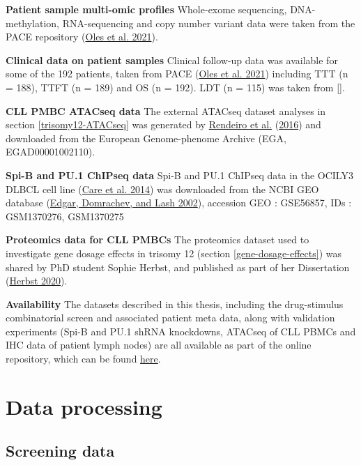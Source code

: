 \documentclass[11pt, a4paper, twosided]{book}
\begin{document}
\textbf{Patient sample multi-omic profiles} Whole-exome sequencing, DNA-methylation, RNA-sequencing and copy number variant data were taken from the PACE repository (\protect\hyperlink{ref-R-BloodCancerMultiOmics2017}{Oles et al. 2021}).

\textbf{Clinical data on patient samples} Clinical follow-up data was available for some of the 192 patients, taken from PACE (\protect\hyperlink{ref-R-BloodCancerMultiOmics2017}{Oles et al. 2021}) including TTT (n = 188), TTFT (n = 189) and OS (n = 192). LDT (n = 115) was taken from {[}{]}.

\textbf{CLL PMBC ATACseq data} The external ATACseq dataset analyses in section \ref{trisomy12-ATACseq} was generated by \protect\hyperlink{ref-Rendeiro2016}{Rendeiro et al.} (\protect\hyperlink{ref-Rendeiro2016}{2016}) and downloaded from the European Genome-phenome Archive (EGA, EGAD00001002110).

\textbf{Spi-B and PU.1 ChIPseq data}
Spi-B and PU.1 ChIPseq data in the OCILY3 DLBCL cell line (\protect\hyperlink{ref-Care2014}{Care et al. 2014}) was downloaded from the NCBI GEO database (\protect\hyperlink{ref-Edgar2002}{Edgar, Domrachev, and Lash 2002}), accession GEO : GSE56857, IDs : GSM1370276, GSM1370275

\textbf{Proteomics data for CLL PMBCs}
The proteomics dataset used to investigate gene dosage effects in trisomy 12 (section \ref{gene-dosage-effects}) was shared by PhD student Sophie Herbst, and published as part of her Dissertation (\protect\hyperlink{ref-HerbstThesis}{Herbst 2020}).

\textbf{Availability}
The datasets described in this thesis, including the drug-stimulus combinatorial screen and associated patient meta data, along with validation experiments (Spi-B and PU.1 shRNA knockdowns, ATACseq of CLL PBMCs and IHC data of patient lymph nodes) are all available as part of the online repository, which can be found \href{https://github.com/Huber-group-EMBL/CLLCytokineScreen2021}{here}.

\hypertarget{data-processing}{%
\section{Data processing}\label{data-processing}}

\hypertarget{screening-data}{%
\subsection{Screening data}\label{screening-data}}
\end{document}
